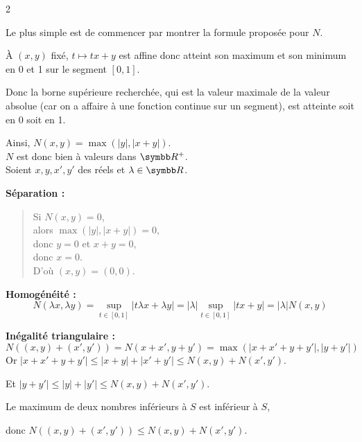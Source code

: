 \begin{correction}{2}

    Le plus simple est de commencer par montrer la formule proposée pour $N$.

    À $(x,y)$ fixé, $t \mapsto tx+y$ est affine donc atteint son maximum et son minimum en 0 et 1 sur le segment $[0,1]$.

    Donc la borne supérieure recherchée, qui est la valeur maximale de la valeur absolue
    (car on a affaire à une fonction continue sur un segment), est atteinte soit en 0 soit en 1.

    Ainsi, $N(x,y) = \max(|y|, |x+y|)$. \\

    $N$ est donc bien à valeurs dans $\R^+$. \\

    Soient $x,y, x', y'$ des réels et $\lambda \in \R$.

    \newpage
    
    \textbf{Séparation :}
    \begin{quote}
        Si $N(x,y) = 0$, \\
        alors $\max(|y|, |x+y|) = 0$, \\
        donc $y = 0$ et $x+y = 0$, \\
        donc $x=0$. \\
        D'où $(x,y) = (0,0)$.
    \end{quote}

    \textbf{Homogénéité :}
    \[N(\lambda x, \lambda y) = \sup_{t \in [0,1]} |t\lambda x + \lambda y| = |\lambda| \sup_{t \in [0,1]} |tx+y| = |\lambda| N(x,y)\]

    \textbf{Inégalité triangulaire :}
    \[N((x,y) + (x',y')) = N(x+x', y+y') = \max(|x+x'+y+y'|, |y+y'|)\]
    Or $|x+x'+y+y'| \le |x+y| + |x'+y'| \le N(x,y) + N(x',y')$.

    Et $|y+y'| \le |y| + |y'| \le N(x,y) + N(x',y')$.

    Le maximum de deux nombres inférieurs à $S$ est inférieur à $S$,
    
    donc $N((x,y)+(x',y')) \le N(x,y) + N(x',y')$.
\end{correction}

